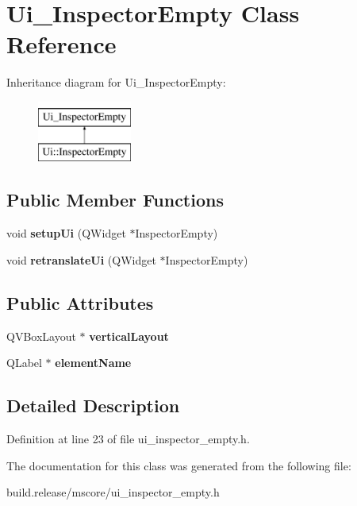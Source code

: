 \hypertarget{class_ui___inspector_empty}{}\section{Ui\+\_\+\+Inspector\+Empty Class Reference}
\label{class_ui___inspector_empty}
Inheritance diagram for Ui\+\_\+\+Inspector\+Empty\+:\begin{figure}[H]
\begin{center}
\leavevmode
\includegraphics[height=2.000000cm]{class_ui___inspector_empty}
\end{center}
\end{figure}
\subsection*{Public Member Functions}
\begin{DoxyCompactItemize}
\item 
\mbox{\label{class_ui___inspector_empty_ad99257c8d249ef8c8a0fe25b8f2f33ff}} 
void {\bfseries setup\+Ui} (Q\+Widget $\ast$Inspector\+Empty)
\item 
\mbox{\label{class_ui___inspector_empty_afb89a85ba192ac3fb8d2e41a35dda3b5}} 
void {\bfseries retranslate\+Ui} (Q\+Widget $\ast$Inspector\+Empty)
\end{DoxyCompactItemize}
\subsection*{Public Attributes}
\begin{DoxyCompactItemize}
\item 
\mbox{\label{class_ui___inspector_empty_ae99b8a43420a56c2ed76693517d36e4d}} 
Q\+V\+Box\+Layout $\ast$ {\bfseries vertical\+Layout}
\item 
\mbox{\label{class_ui___inspector_empty_add5964f637fd6454cd7041468cde11f9}} 
Q\+Label $\ast$ {\bfseries element\+Name}
\end{DoxyCompactItemize}


\subsection{Detailed Description}


Definition at line 23 of file ui\+\_\+inspector\+\_\+empty.\+h.



The documentation for this class was generated from the following file\+:\begin{DoxyCompactItemize}
\item 
build.\+release/mscore/ui\+\_\+inspector\+\_\+empty.\+h\end{DoxyCompactItemize}
